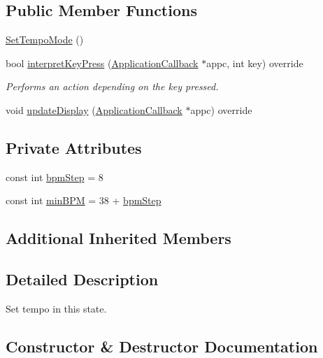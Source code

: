 \subsection*{Public Member Functions}
\begin{DoxyCompactItemize}
\item 
\hyperlink{classdrumpi_1_1SetTempoMode_a2ddc51d8297abf394d91b3cb77d746d2}{Set\+Tempo\+Mode} ()
\item 
bool \hyperlink{classdrumpi_1_1SetTempoMode_a659f307caf23a57e3319ff6c510d41bf}{interpret\+Key\+Press} (\hyperlink{classdrumpi_1_1ApplicationCallback}{Application\+Callback} $\ast$appc, int key) override
\begin{DoxyCompactList}\small\item\em Performs an action depending on the key pressed. \end{DoxyCompactList}\item 
void \hyperlink{classdrumpi_1_1SetTempoMode_a965294425ec5abfccd8e3cbb9f1dbc3d}{update\+Display} (\hyperlink{classdrumpi_1_1ApplicationCallback}{Application\+Callback} $\ast$appc) override
\end{DoxyCompactItemize}
\subsection*{Private Attributes}
\begin{DoxyCompactItemize}
\item 
const int \hyperlink{classdrumpi_1_1SetTempoMode_acfb74b197bfd795f732b6d9684848af0}{bpm\+Step} = 8
\item 
const int \hyperlink{classdrumpi_1_1SetTempoMode_ad63e356af339b7673cc8af6f7c0adac0}{min\+B\+PM} = 38 + \hyperlink{classdrumpi_1_1SetTempoMode_acfb74b197bfd795f732b6d9684848af0}{bpm\+Step}
\end{DoxyCompactItemize}
\subsection*{Additional Inherited Members}


\subsection{Detailed Description}
Set tempo in this state. 

\subsection{Constructor \& Destructor Documentation}
\mbox{\label{classdrumpi_1_1SetTempoMode_a2ddc51d8297abf394d91b3cb77d746d2}} 
